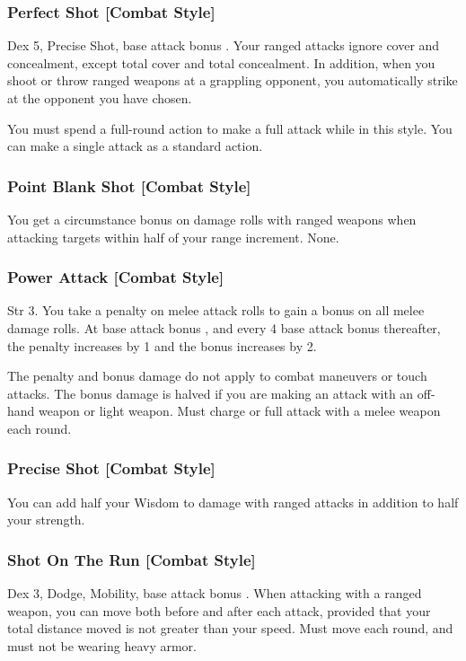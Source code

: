 \subsubsection{Perfect Shot [Combat Style]}
 Dex 5, Precise Shot, base attack bonus .
 Your ranged attacks ignore cover and concealment, except total cover and total concealment. In addition, when you shoot or throw ranged weapons at a grappling opponent, you automatically strike at the opponent you have chosen.

You must spend a full-round action to make a full attack while in this style. You can make a single attack as a standard action.

\subsubsection{Point Blank Shot [Combat Style]}
 You get a  circumstance bonus on damage rolls with ranged weapons when attacking targets within half of your range increment. \babscalingdescription
{} None.

\subsubsection{Power Attack [Combat Style]}
 Str 3.
 You take a  penalty on melee attack rolls to gain a  bonus on all melee damage rolls. At base attack bonus , and every 4 base attack bonus thereafter, the penalty increases by 1 and the bonus increases by 2.
\par The penalty and bonus damage do not apply to combat maneuvers or touch attacks. The bonus damage is halved if you are making an attack with an off-hand weapon or light weapon.
 Must charge or full attack with a melee weapon each round.

\subsubsection{Precise Shot [Combat Style]}
 You can add half your Wisdom to damage with ranged attacks in addition to half your strength.

\subsubsection{Shot On The Run [Combat Style]}
 Dex 3, Dodge, Mobility, base attack bonus .
 When attacking with a ranged weapon, you can move both before and after each attack, provided that your total distance moved is not greater than your speed.
 Must move each round, and must not be wearing heavy armor.

